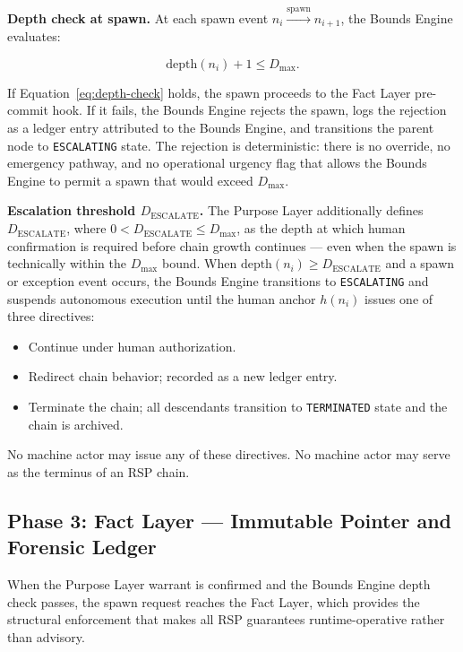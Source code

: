 \medskip
\noindent\textbf{Depth check at spawn.} At each spawn event $n_i \xrightarrow{\text{spawn}} n_{i+1}$, the Bounds Engine evaluates:

\begin{equation}
\text{depth}(n_i) + 1 \leq D_{\max}.
\label{eq:depth-check}
\end{equation}

If Equation~\ref{eq:depth-check} holds, the spawn proceeds to the Fact Layer pre-commit hook. If it fails, the Bounds Engine rejects the spawn, logs the rejection as a ledger entry attributed to the Bounds Engine, and transitions the parent node to \texttt{ESCALATING} state. The rejection is deterministic: there is no override, no emergency pathway, and no operational urgency flag that allows the Bounds Engine to permit a spawn that would exceed $D_{\max}$.

\medskip
\noindent\textbf{Escalation threshold $D_{\text{ESCALATE}}$.} The Purpose Layer additionally defines $D_{\text{ESCALATE}}$, where $0 < D_{\text{ESCALATE}} \leq D_{\max}$, as the depth at which human confirmation is required before chain growth continues — even when the spawn is technically within the $D_{\max}$ bound. When $\text{depth}(n_i) \geq D_{\text{ESCALATE}}$ and a spawn or exception event occurs, the Bounds Engine transitions to \texttt{ESCALATING} and suspends autonomous execution until the human anchor $h(n_i)$ issues one of three directives:

\begin{itemize}
    \item[\texttt{ACK}] Continue under human authorization.
    \item[\texttt{RESOLVE}] Redirect chain behavior; recorded as a new ledger entry.
    \item[\texttt{REJECT}] Terminate the chain; all descendants transition to \texttt{TERMINATED} state and the chain is archived.
\end{itemize}

No machine actor may issue any of these directives. No machine actor may serve as the terminus of an RSP chain.

\subsection{Phase 3: Fact Layer — Immutable Pointer and Forensic Ledger}
\label{sec:rs-fact-layer}

When the Purpose Layer warrant is confirmed and the Bounds Engine depth check passes, the spawn request reaches the Fact Layer, which provides the structural enforcement that makes all RSP guarantees runtime-operative rather than advisory.

